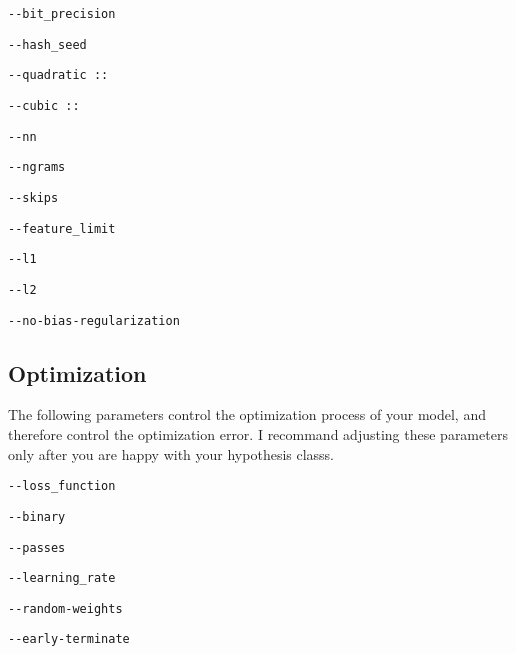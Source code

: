 \documentclass[10pt]{exam}
\theoremstyle{definition}
\begin{document}
    \vspace{1in}
    \lstinline{--bit_precision}

    \vspace{2in}
    \lstinline{--hash_seed}

    \vspace{2in}
    \lstinline{--quadratic ::}

    \vspace{2in}
    \lstinline{--cubic ::}
    
    \vspace{2in}
    \lstinline{--nn}
    
    \vspace{2in}
    \lstinline{--ngrams}
    
    \vspace{2in}
    \lstinline{--skips}
    
    \vspace{2in}
    \lstinline{--feature_limit}
    
    \vspace{2in}
    \lstinline{--l1}
    
    \vspace{2in}
    \lstinline{--l2}
    
    \vspace{2in}
    \lstinline{--no-bias-regularization}
    \vspace{1in}

    \newpage
\subsection{Optimization}
    The following parameters control the optimization process of your model,
    and therefore control the optimization error.
    I recommand adjusting these parameters only after you are happy with your hypothesis classs.

    \vspace{0.5in}
    \lstinline{--loss_function}

    \vspace{1in}
    \lstinline{--binary}

    \vspace{1in}
    \lstinline{--passes}

    \vspace{1in}
    \lstinline{--learning_rate}

    \vspace{1in}
    \lstinline{--random-weights}

    \vspace{1in}
    \lstinline{--early-terminate}
\end{document}
